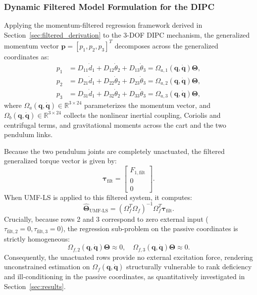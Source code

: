 \documentclass[lettersize,journal]{IEEEtran}
\begin{document}
\subsubsection{Dynamic Filtered Model Formulation for the DIPC}
Applying the momentum-filtered regression framework derived in Section~\ref{sec:filtered_derivation} to the 3-DOF DIPC mechanism, the generalized momentum vector $\bm{p} = [p_1, p_2, p_3]^T$ decomposes across the generalized coordinates as:
\begin{align}
    p_1 &= D_{11}\dot{d}_1 + D_{12}\dot{\theta}_2 + D_{13}\dot{\theta}_3 = \Omega_{a,1}(\bm{q}, \dot{\bm{q}})\bm{\Theta}, \label{eq:dipc_p1} \\
    p_2 &= D_{21}\dot{d}_1 + D_{22}\dot{\theta}_2 + D_{23}\dot{\theta}_3 = \Omega_{a,2}(\bm{q}, \dot{\bm{q}})\bm{\Theta}, \label{eq:dipc_p2} \\
    p_3 &= D_{31}\dot{d}_1 + D_{32}\dot{\theta}_2 + D_{33}\dot{\theta}_3 = \Omega_{a,3}(\bm{q}, \dot{\bm{q}})\bm{\Theta}, \label{eq:dipc_p3}
\end{align}
where $\Omega_a(\bm{q}, \dot{\bm{q}}) \in \mathbb{R}^{3 \times 24}$ parameterizes the momentum vector, and $\Omega_b(\bm{q}, \dot{\bm{q}}) \in \mathbb{R}^{3 \times 24}$ collects the nonlinear inertial coupling, Coriolis and centrifugal terms, and gravitational moments across the cart and the two pendulum links.

Because the two pendulum joints are completely unactuated, the filtered generalized torque vector is given by:
\begin{equation}
    \bm{\tau}_{\text{filt}} = \begin{bmatrix} F_{1,\text{filt}} \\ 0 \\ 0 \end{bmatrix}.
    \label{eq:dipc_filtered_tau}
\end{equation}
When UMF-LS \cite{AguilarSierra2014} is applied to this filtered system, it computes:
\begin{equation}
    \hat{\bm{\Theta}}_{\text{UMF-LS}} = \left(\Omega_f^T \Omega_f\right)^{-1} \Omega_f^T \bm{\tau}_{\text{filt}}.
    \label{eq:mfls_solution}
\end{equation}
Crucially, because rows 2 and 3 correspond to zero external input ($\tau_{\text{filt},2} = 0, \tau_{\text{filt},3} = 0$), the regression sub-problem on the passive coordinates is strictly homogeneous:
\begin{equation}
    \Omega_{f,2}(\bm{q}, \dot{\bm{q}})\bm{\Theta} \approx 0, \quad \Omega_{f,3}(\bm{q}, \dot{\bm{q}})\bm{\Theta} \approx 0.
    \label{eq:dipc_homog}
\end{equation}
Consequently, the unactuated rows provide no external excitation force, rendering unconstrained estimation on $\Omega_f(\bm{q}, \dot{\bm{q}})$ structurally vulnerable to rank deficiency and ill-conditioning in the passive coordinates, as quantitatively investigated in Section~\ref{sec:results}.
\end{document}

